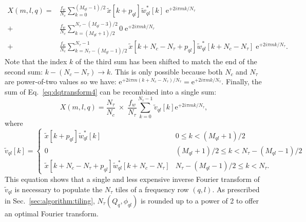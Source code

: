 \begin{align}
  X(m, l, q)
  = & \frac{f_w}{N_c} \sum_{k=0}^{(M_{ql}-1)/2}{\tilde{x}[k+p_{ql}]\tilde{w}_{ql}^*[k] \; \mathrm{e}^{+2i\pi mk/N_\tau}} \\
  + & \frac{f_w}{N_c} \sum_{k=(M_{ql}+1)/2}^{N_\tau-(M_{ql}-3)/2}{0 \; \mathrm{e}^{+2i\pi mk/N_\tau}} \\
  + & \frac{f_w}{N_c} \sum_{k=N_\tau-(M_{ql}-1)/2}^{N_\tau-1}{\tilde{x}[k+N_c-N_\tau+p_{ql}]\tilde{w}_{ql}^*[k+N_c-N_\tau] \; \mathrm{e}^{+2i\pi mk/N_\tau}} .
  \label{eq:dqtransform4}
\end{align}
Note that the index $k$ of the third sum has been shifted to match the end of the second sum: $k-(N_c-N_\tau) \rightarrow k$. This is only possible because both $N_c$ and $N_\tau$ are power-of-two values so we have: $\mathrm{e}^{+2i\pi m(k+N_c-N_\tau)/N_\tau} = \mathrm{e}^{+2i\pi mk/N_\tau}$. Finally, the sum of Eq.~\ref{eq:dqtransform4} can be recombined into a single sum:
\begin{equation}
  X(m, l, q) = \frac{N_\tau}{N_c} \; \times \; \frac{f_w}{N_\tau} \sum_{k=0}^{N_\tau-1}{\tilde{v}_{ql}[k]\mathrm{e}^{+2i\pi mk/N_\tau}},
  \label{eq:dqtransform5}
\end{equation}
where
\begin{equation}
  \tilde{v}_{ql}[k] =
  \begin{cases}
    \tilde{x}[k+p_{ql}]\tilde{w}_{ql}^*[k]                     & 0 \le k < (M_{ql}+1)/2 \\
    0                                                        & (M_{ql}+1)/2 \le k < N_\tau-(M_{ql}-1)/2 \\
    \tilde{x}[k+N_c-N_\tau+p_{ql}]\tilde{w}_{ql}^*[k+N_c-N_\tau] & N_\tau-(M_{ql}-1)/2 \le k < N_\tau.
  \end{cases}
  \label{eq:v1}
\end{equation}
This equation shows that a single and less expensive inverse Fourier transform of $\tilde{v}_{ql}$ is necessary to populate the $N_\tau$ tiles of a frequency row $(q,l)$. As prescribed in Sec.~\ref{sec:algorithm:tiling}, $N_\tau(Q_q, \phi_{ql})$ is rounded up to a power of 2 to offer an optimal Fourier transform.

